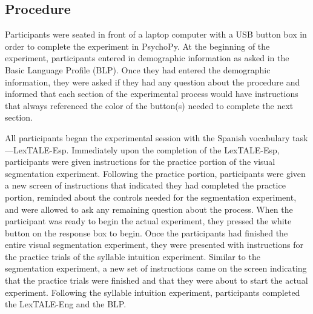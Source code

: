 \documentclass[
12pt, %
english, %
doublespacing, %
nolistspacing, %
liststotoc, %
headsepline, %
chapterinoneline, %
openany, %
]{DoctoralThesis}\usepackage[]{graphicx}\usepackage[]{color}
\begin{document}


\subsection{Procedure}
Participants were seated in front of a laptop computer with a USB button box in order to complete the experiment in PsychoPy. At the beginning of the experiment, participants entered in demographic information as asked in the Basic Language Profile (BLP). Once they had entered the demographic information, they were asked if they had any question about the procedure and informed that each section of the experimental process would have instructions that always referenced the color of the button(s) needed to complete the next section.

All participants began the experimental session with the Spanish vocabulary task---LexTALE-Esp. %
Immediately upon the completion of the LexTALE-Esp, participants were given instructions for the practice portion of the visual segmentation experiment. Following the practice portion, participants were given a new screen of instructions that indicated they had completed the practice portion, reminded about the controls needed for the segmentation experiment, and were allowed to ask any remaining question about the process. When the participant was ready to begin the actual experiment, they pressed the white button on the response box to begin. Once the participants had finished the entire visual segmentation experiment, they were presented with instructions for the practice trials of the syllable intuition experiment. Similar to the segmentation experiment, a new set of instructions came on the screen indicating that the practice trials were finished and that they were about to start the actual experiment. Following the syllable intuition experiment, participants completed the LexTALE-Eng and the BLP.
\end{document}

